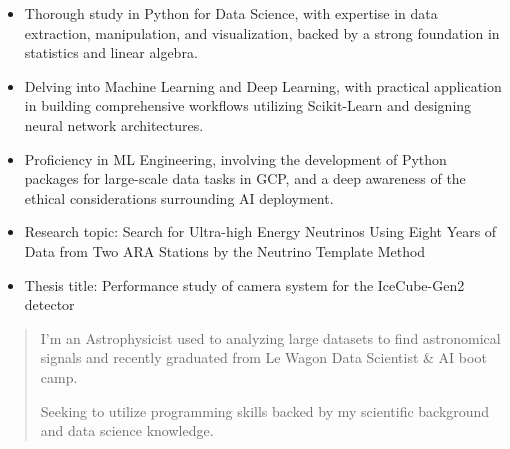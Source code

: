 \documentclass[10pt,a4paper,ragged2e,withhyper]{altacv}
\begin{document}
\begin{paracol}{2}
\begin{itemize}
\item Thorough study in Python for Data Science, with expertise in data extraction, manipulation, and visualization, backed by a strong foundation in statistics and linear algebra.
\item Delving into Machine Learning and Deep Learning, with practical application in building comprehensive workflows utilizing Scikit-Learn and designing neural network architectures.
\item Proficiency in ML Engineering, involving the development of Python packages for large-scale data tasks in GCP, and a deep awareness of the ethical considerations surrounding AI deployment.
\end{itemize}
\divider

\begin{itemize}
\item Research topic: Search for Ultra-high Energy Neutrinos Using Eight Years of Data from Two ARA Stations by the Neutrino Template Method
\end{itemize}
\divider

\begin{itemize}
\item Thesis title: Performance study of camera system for the IceCube-Gen2 detector
\end{itemize}
\divider


\switchcolumn


\begin{quote}
I'm an Astrophysicist used to analyzing large datasets to find astronomical signals and recently graduated from Le Wagon Data Scientist \& AI boot camp. 

Seeking to utilize programming skills backed by my scientific background and data science knowledge.
\end{quote}


\\
\\


\end{paracol}
\end{document}
